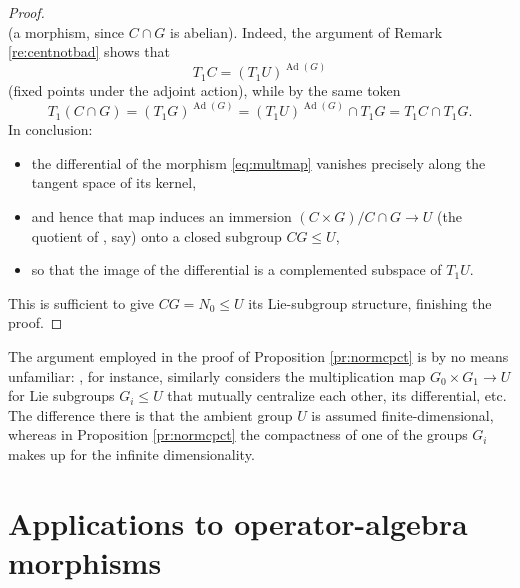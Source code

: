 \documentclass[10pt,a4paper]{amsart}
\numberwithin{equation}{section}
\begin{document}
\begin{proof}
\begin{equation*}
 \end{equation*}
 (a morphism, since $C\cap G$ is abelian). Indeed, the argument of Remark \ref{re:centnotbad} shows that
 \begin{equation*}
 T_1C = (T_1U)^{\operatorname{Ad}(G)}
 \end{equation*}
 (fixed points under the adjoint action), while by the same token
 \begin{equation*}
 T_1(C\cap G) = (T_1G)^{\operatorname{Ad}(G)} = (T_1U)^{\operatorname{Ad}(G)}\cap T_1G = T_1C\cap T_1G.
 \end{equation*}
 In conclusion:
 \begin{itemize}\itemsep=0pt
 \item the differential of the morphism \eqref{eq:multmap} vanishes precisely along the tangent space of its kernel,
 \item and hence that map induces an immersion $(C\times G)/C\cap G\to U$ (the quotient of \cite[Section~III.1.6, Proposition 11\,(ii)]{bourb-lie-13}, say) onto a closed subgroup ${CG\le U}$,
 \item so that the image of the differential is a complemented subspace of $T_1U$.
 \end{itemize}
 This is sufficient to give $CG=N_0\le U$ its Lie-subgroup structure, finishing the proof.
\end{proof}

\begin{Remark}\label{re:isothmbourb}
 The argument employed in the proof of Proposition \ref{pr:normcpct} is by no means unfamiliar: \cite[Section~III.3.8, Proposition 30]{bourb-lie-13}, for instance, similarly considers the multiplication map $G_0\times G_1\to U$ for Lie subgroups $G_i\le U$ that mutually centralize each other, its differential, etc. The difference there is that the ambient group $U$ is assumed finite-dimensional, whereas in Proposition \ref{pr:normcpct} the compactness of one of the groups $G_i$ makes up for the infinite dimensionality.
\end{Remark}

\section{Applications to operator-algebra morphisms}\label{se:oaapp}

\end{document}
